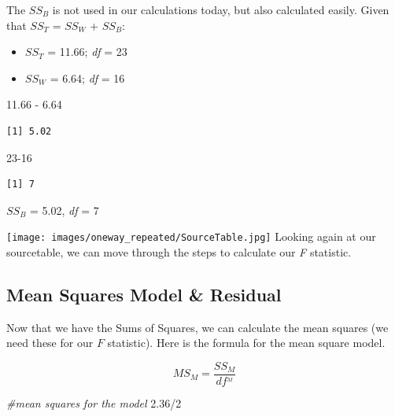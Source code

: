 \documentclass[
  11pt,
]{book}
\newenvironment{Shaded}{\begin{snugshade}}{\end{snugshade}}
\newcommand{\CommentTok}[1]{\textcolor[rgb]{0.56,0.35,0.01}{\textit{#1}}}
\newcommand{\DecValTok}[1]{\textcolor[rgb]{0.00,0.00,0.81}{#1}}
\newcommand{\FloatTok}[1]{\textcolor[rgb]{0.00,0.00,0.81}{#1}}
\newcommand{\SpecialCharTok}[1]{\textcolor[rgb]{0.00,0.00,0.00}{#1}}
\providecommand{\tightlist}{%
  \setlength{\itemsep}{0pt}\setlength{\parskip}{0pt}}
\begin{document}
The \(SS_B\) is not used in our calculations today, but also calculated easily. Given that \(SS_T\) = \(SS_W\) + \(SS_B\):

\begin{itemize}
\tightlist
\item
  \(SS_T\) = 11.66; \emph{df} = 23
\item
  \(SS_W\) = 6.64; \emph{df} = 16
\end{itemize}

\begin{Shaded}
\begin{Highlighting}[]
\FloatTok{11.66} \SpecialCharTok{{-}} \FloatTok{6.64}
\end{Highlighting}
\end{Shaded}

\begin{verbatim}
[1] 5.02
\end{verbatim}

\begin{Shaded}
\begin{Highlighting}[]
\DecValTok{23{-}16}
\end{Highlighting}
\end{Shaded}

\begin{verbatim}
[1] 7
\end{verbatim}

\(SS_B\) = 5.02, \emph{df} = 7

\texttt{[image: images/oneway\_repeated/SourceTable.jpg]}
Looking again at our sourcetable, we can move through the steps to calculate our \emph{F} statistic.

\hypertarget{mean-squares-model-residual-1}{%
\subsection{Mean Squares Model \& Residual}\label{mean-squares-model-residual-1}}

Now that we have the Sums of Squares, we can calculate the mean squares (we need these for our \(F\) statistic). Here is the formula for the mean square model.

\[MS_M = \frac{SS_{M}}{df^{_{M}}}\]

\begin{Shaded}
\begin{Highlighting}[]
\CommentTok{\#mean squares for the model}
\FloatTok{2.36}\SpecialCharTok{/}\DecValTok{2}
\end{Highlighting}
\end{Shaded}
\end{document}
